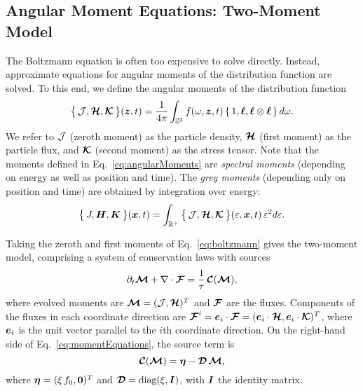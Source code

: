 \subsection{Angular Moment Equations: Two-Moment Model}

The Boltzmann equation is often too expensive to solve directly.  
Instead, approximate equations for angular moments of the distribution function are solved.  
To this end, we define the angular moments of the distribution function
\begin{equation}
  \big\{\,\mathcal{J},\boldsymbol{\mathcal{H}},\boldsymbol{\mathcal{K}}\,\big\}(\boldsymbol{z},t)
  =\frac{1}{4\pi}\int_{\mathbb{S}^{2}}f(\omega,\boldsymbol{z},t)\,\{\,1,\boldsymbol{\ell},\boldsymbol{\ell}\otimes\boldsymbol{\ell}\,\}\,d\omega.  
  \label{eq:angularMoments}
\end{equation}
We refer to $\mathcal{J}$ (zeroth moment) as the particle density, $\boldsymbol{\mathcal{H}}$ (first moment) as the particle flux, and $\boldsymbol{\mathcal{K}}$ (second moment) as the stress tensor.  
Note that the moments defined in Eq.~\eqref{eq:angularMoments} are \emph{spectral moments} (depending on energy as well as position and time).  
The \emph{grey moments} (depending only on position and time) are obtained by integration over energy:
\begin{equation}
  \big\{\,J,\boldsymbol{H},\boldsymbol{K}\,\big\}(\boldsymbol{x},t)
  =\int_{\mathbb{R}^{+}}\big\{\,\mathcal{J},\boldsymbol{\mathcal{H}},\boldsymbol{\mathcal{K}}\,\big\}(\varepsilon,\boldsymbol{x},t)\,\varepsilon^{2}d\varepsilon.  
\end{equation}

Taking the zeroth and first moments of Eq.~\eqref{eq:boltzmann} gives the two-moment model, comprising a system of conservation laws with sources
\begin{equation}
  \partial_{t}{\boldsymbol{\mathcal{M}}}+\nabla\cdot\boldsymbol{\mathcal{F}}=\frac{1}{\tau}\,\boldsymbol{\mathcal{C}}(\boldsymbol{\mathcal{M}}),
  \label{eq:momentEquations}
\end{equation}
where evolved moments are $\boldsymbol{\mathcal{M}}=(\mathcal{J},\boldsymbol{\mathcal{H}})^{T}$ and $\boldsymbol{\mathcal{F}}$ are the fluxes.  
Components of the fluxes in each coordinate direction are $\boldsymbol{\mathcal{F}}^{i}=\boldsymbol{e}_{i}\cdot\boldsymbol{\mathcal{F}}=(\boldsymbol{e}_{i}\cdot\boldsymbol{\mathcal{H}},\boldsymbol{e}_{i}\cdot\boldsymbol{\mathcal{K}})^{T}$, where $\boldsymbol{e}_{i}$ is the unit vector parallel to the $i$th coordinate direction.  
On the right-hand side of Eq.~\eqref{eq:momentEquations}, the source term is
\begin{equation}
  \boldsymbol{\mathcal{C}}(\boldsymbol{\mathcal{M}})=\boldsymbol{\eta}-\boldsymbol{\mathcal{D}}\,\boldsymbol{\mathcal{M}}, 
  \label{eq:collisionTermMoments}
\end{equation}
where $\boldsymbol{\eta}=(\xi\,f_{0},\boldsymbol{0})^{T}$ and $\boldsymbol{\mathcal{D}}=\mbox{diag}(\xi,\boldsymbol{I})$, with $\boldsymbol{I}$ the identity matrix.  

